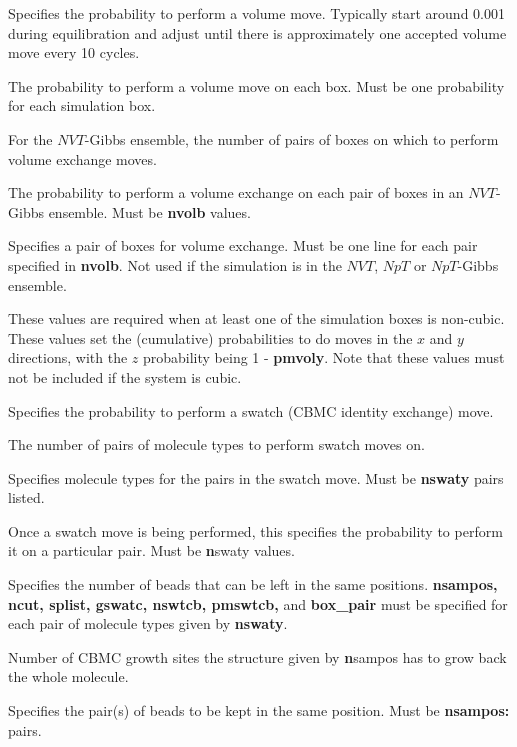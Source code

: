 \documentclass[12pt,letterpaper]{article}
\begin{document}
 Specifies the probability to perform a volume
move.  Typically start around 0.001 during equilibration and adjust until 
there is approximately one accepted volume move every 10 cycles.

 The probability to perform a volume move on each box.
Must be one probability for each simulation box.

 For the $NVT$-Gibbs ensemble, the number of pairs of
boxes on which to perform volume exchange moves.

 The probability to perform a volume exchange on
each pair of boxes in an $NVT$-Gibbs ensemble.  Must be {\textbf {nvolb}}
values.

 Specifies a pair of boxes for volume
exchange.  Must be one line for each pair specified in {\textbf {nvolb}}.
Not used if the simulation is in the $NVT$, $NpT$ or $NpT$-Gibbs ensemble.

 These values are required when at least one of the
simulation boxes is non-cubic.  These values set the (cumulative) probabilities
to do moves in the $x$ and $y$ directions, with the $z$ probability
being 1 - {\textbf {pmvoly}}.
Note that these values must not be included if the system is cubic.

 Specifies the probability to perform a swatch
(CBMC identity exchange) move.

 The number of pairs of molecule types to perform
swatch moves on.

 Specifies molecule types for the pairs in the
swatch move.  Must be {\textbf {nswaty}} pairs listed.

 Once a swatch move is being performed, this
specifies the probability to perform it on a particular pair.  Must be
{\textbf nswaty} values.

 Specifies the number of beads that can be left
in the same positions.  {\textbf {nsampos, ncut, splist, gswatc, nswtcb,
pmswtcb,}} and {\textbf {box\_pair}} must be specified for each pair of
molecule types given by {\textbf {nswaty}}.

 Number of CBMC growth sites the structure given by
{\textbf nsampos} has to grow back the whole molecule.

 Specifies the pair(s) of beads to be kept in the
same position.  Must be {\textbf {nsampos:}} pairs.
\end{document}
